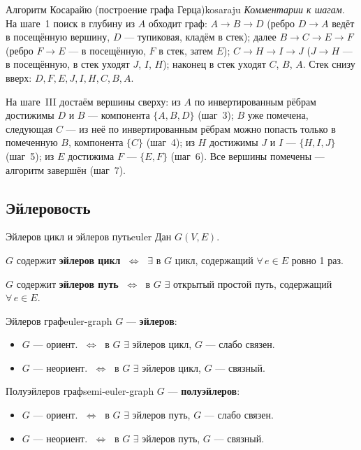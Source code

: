 \begin{algo}{Алгоритм Косарайю (построение графа Герца)}{kosaraju}
\noindent\textit{Комментарии к шагам.} На шаге~1 поиск в глубину из $A$
обходит граф: $A \to B \to D$ (ребро $D \to A$ ведёт в посещённую
вершину, $D$ --- тупиковая, кладём в стек); далее $B \to C \to E \to F$
(ребро $F \to E$ --- в посещённую, $F$ в стек, затем $E$);
$C \to H \to I \to J$ ($J \to H$ --- в посещённую, в стек уходят
$J$, $I$, $H$); наконец в стек уходят $C$, $B$, $A$. Стек снизу вверх:
$D, F, E, J, I, H, C, B, A$.

На шаге~III достаём вершины сверху: из $A$ по инвертированным рёбрам
достижимы $D$ и $B$ --- компонента $\{A, B, D\}$ (шаг~3); $B$ уже
помечена, следующая $C$ --- из неё по инвертированным рёбрам можно
попасть только в помеченную $B$, компонента $\{C\}$ (шаг~4); из $H$
достижимы $J$ и $I$ --- $\{H, I, J\}$ (шаг~5); из $E$ достижима $F$ ---
$\{E, F\}$ (шаг~6). Все вершины помечены --- алгоритм завершён (шаг~7).
\end{algo}


\subsection*{Эйлеровость}

\begin{defn}{Эйлеров цикл и эйлеров путь}{euler}
Дан $G(V, E)$.

$G$ содержит \textbf{эйлеров цикл} $\;\Leftrightarrow\;$ $\exists$ в $G$ цикл, содержащий
$\forall\, e \in E$ ровно 1 раз.

$G$ содержит \textbf{эйлеров путь} $\;\Leftrightarrow\;$ в $G$ $\exists$ открытый простой
путь, содержащий $\forall\, e \in E$.
\end{defn}

\begin{defn}{Эйлеров граф}{euler-graph}
$G$ --- \textbf{эйлеров}:
\begin{itemize}
  \item $G$ --- ориент. $\;\Leftrightarrow\;$ в $G$ $\exists$ эйлеров цикл, $G$ --- слабо связен.
  \item $G$ --- неориент. $\;\Leftrightarrow\;$ в $G$ $\exists$ эйлеров цикл, $G$ --- связный.
\end{itemize}
\end{defn}

\begin{defn}{Полуэйлеров граф}{semi-euler-graph}
$G$ --- \textbf{полуэйлеров}:
\begin{itemize}
  \item $G$ --- ориент. $\;\Leftrightarrow\;$ в $G$ $\exists$ эйлеров путь, $G$ --- слабо связен.
  \item $G$ --- неориент. $\;\Leftrightarrow\;$ в $G$ $\exists$ эйлеров путь, $G$ --- связный.
\end{itemize}
\end{defn}

